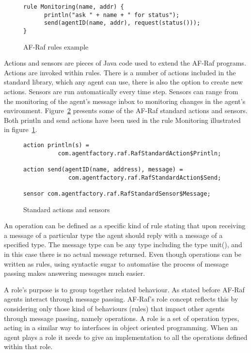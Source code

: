 \documentclass[a4paper,12pt,oneside,fleqn]{book} %
\theoremstyle{plain}
\theoremstyle{definition}
\theoremstyle{remark}
\begin{document}
\begin{figure}\footnotesize %
\begin{verbatim}
rule Monitoring(name, addr) {
      println("ask " + name + " for status");
      send(agentID(name, addr), request(status()));
}
\end{verbatim}
\caption{AF-Raf rules example}
\label{fig:rule}
\end{figure} %

Actions and sensors are pieces of Java code used to extend the AF-Raf
programs. Actions are invoked within rules. There is a number of actions
included in the standard library, which any agent can use, there is also
the option to create new actions. Sensors are run automatically every time
step. Sensors can range from the monitoring of the agent's message inbox to
monitoring changes in the agent's environment.
Figure~\ref{fig:actions-sensors} presents some of the AF-Raf standard
actions and sensors. Both println and send actions have been used in the
rule Monitoring illustrated in figure~\ref{fig:rule}.


\begin{figure}\footnotesize %
\begin{verbatim}
action println(s) = 
          com.agentfactory.raf.RafStandardAction$Println;

action send(agentID(name, address), message) = 
             com.agentfactory.raf.RafStandardAction$Send;

sensor com.agentfactory.raf.RafStandardSensor$Message;
\end{verbatim}
\caption{Standard actions and sensors}
\label{fig:actions-sensors}
\end{figure} %


An operation can be defined as a specific kind of rule stating that upon
receiving a message of a particular type the agent should reply with a
message of a specified type. The message type can be any type including the
type unit(), and in this case there is no actual message returned. Even
though operations can be written as rules, using syntactic sugar to
automatise the process of message passing makes answering messages much
easier.

A role's purpose is to group together related behaviour. As stated before
AF-Raf agents interact through message passing. AF-Raf's role concept
reflects this by considering only those kind of behaviours (rules) that
impact other agents through message passing, namely operations. A role is a
set of operation types, acting in a similar way to interfaces in object
oriented programming. When an agent plays a role it needs to give an
implementation to all the operations defined within that role.
\end{document}
